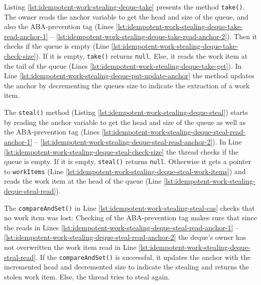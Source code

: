 

Listing \ref{lst:idempotent-work-stealing-deque-take} presents the
method \lstinline!take()!. The owner reads the anchor variable to get
the head and size of the queue, and also the ABA-prevention tag (Lines
\ref{lst:idempotent-work-stealing-deque-take-read-anchor-1} --
\ref{lst:idempotent-work-stealing-deque-take-read-anchor-2}). Then it
checks if the queue is empty (Line
\ref{lst:idempotent-work-stealing-deque-take-check-size}). If it is
empty, \lstinline!take()! returns \lstinline!null!. Else, it reads the
work item at the tail of the queue (Lines
\ref{lst:idempotent-work-stealing-deque-take-get}). In Line
\ref{lst:idempotent-work-stealing-deque-put-update-anchor} the method
updates the anchor by decrementing the queues size to indicate the
extraction of a work item.



The \lstinline!steal()! method (Listing
\ref{lst:idempotent-work-stealing-deque-steal}) starts by reading the
anchor variable to get the head and size of the queue as well as the
ABA-prevention tag (Lines
\ref{lst:idempotent-work-stealing-deque-steal-read-anchor-1} --
\ref{lst:idempotent-work-stealing-deque-steal-read-anchor-2}). In Line
\ref{lst:idempotent-work-stealing-deque-steal-check-size} the thread
checks if the queue is empty. If it is empty, \lstinline!steal()!
returns \lstinline!null!. Otherwise it gets a pointer to
\lstinline!workItems! (Line
\ref{lst:idempotent-work-stealing-deque-steal-work-items}) and reads
the work item at the head of the queue (Line
\ref{lst:idempotent-work-stealing-deque-steal-read}).

The \lstinline!compareAndSet()! in Line
\ref{lst:idempotent-work-stealing-steal-cas} checks that no work item
was lost: Checking of the ABA-prevention tag makes sure that since the
reads in Lines
\ref{lst:idempotent-work-stealing-deque-steal-read-anchor-1} --
\ref{lst:idempotent-work-stealing-deque-steal-read-anchor-2} the
deque's owner has not overwritten the work item read in Line
\ref{lst:idempotent-work-stealing-deque-steal-read}. If the
\lstinline!compareAndSet()! is successful, it updates the anchor with
the incremented head and decremented size to indicate the stealing and
returns the stolen work item. Else, the thread tries to steal again.


